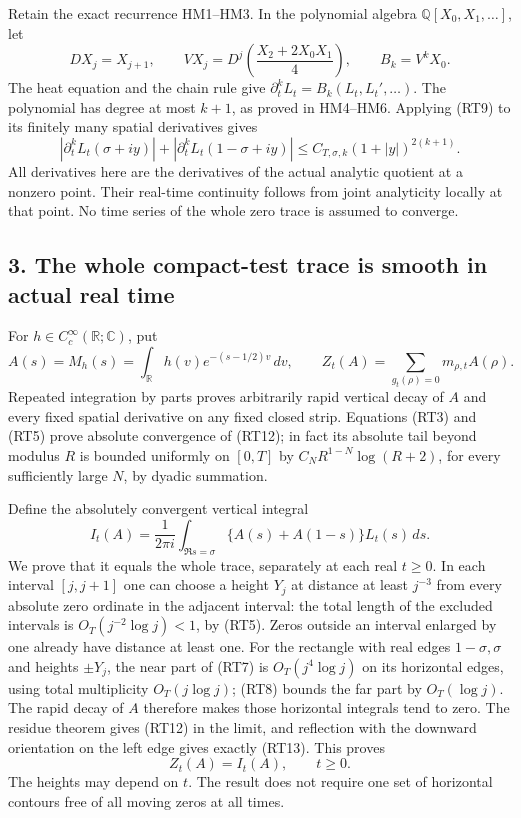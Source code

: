 \documentclass[
  10pt,
  a4paper,
]{article}
\begin{document}
Retain the exact recurrence HM1--HM3. In the polynomial algebra
\(\mathbb Q[X_0,X_1,\ldots]\), let \[
DX_j=X_{j+1},\qquad
VX_j=D^j\!\left(\frac{X_2+2X_0X_1}{4}\right),\qquad
B_k=V^kX_0.
\tag{RT10}
\] The heat equation and the chain rule give
\(\partial_t^kL_t=B_k(L_t,L_t',\ldots)\). The polynomial has degree at
most \(k+1\), as proved in HM4--HM6. Applying (RT9) to its finitely many
spatial derivatives gives \[
|\partial_t^k L_t(\sigma+iy)|+
|\partial_t^k L_t(1-\sigma+iy)|
\le C_{T,\sigma,k}(1+|y|)^{2(k+1)}.
\tag{RT11}
\] All derivatives here are the derivatives of the actual analytic
quotient at a nonzero point. Their real-time continuity follows from
joint analyticity locally at that point. No time series of the whole
zero trace is assumed to converge.

\subsection{3. The whole compact-test trace is smooth in actual real
time}\label{the-whole-compact-test-trace-is-smooth-in-actual-real-time}

For \(h\in C_c^\infty(\mathbb R;\mathbb C)\), put \[
A(s)=M_h(s)=\int_{\mathbb R}h(v)e^{-(s-1/2)v}\,dv,\qquad
Z_t(A)=\sum_{g_t(\rho)=0}m_{\rho,t}A(\rho).
\tag{RT12}
\] Repeated integration by parts proves arbitrarily rapid vertical decay
of \(A\) and every fixed spatial derivative on any fixed closed strip.
Equations (RT3) and (RT5) prove absolute convergence of (RT12); in fact
its absolute tail beyond modulus \(R\) is bounded uniformly on \([0,T]\)
by \(C_N R^{1-N}\log(R+2)\), for every sufficiently large \(N\), by
dyadic summation.

Define the absolutely convergent vertical integral \[
I_t(A)=\frac1{2\pi i}\int_{\Re s=\sigma}
\{A(s)+A(1-s)\}L_t(s)\,ds.
\tag{RT13}
\] We prove that it equals the whole trace, separately at each real
\(t\ge0\). In each interval \([j,j+1]\) one can choose a height \(Y_j\)
at distance at least \(j^{-3}\) from every absolute zero ordinate in the
adjacent interval: the total length of the excluded intervals is
\(O_T(j^{-2}\log j)<1\), by (RT5). Zeros outside an interval enlarged by
one already have distance at least one. For the rectangle with real
edges \(1-\sigma,\sigma\) and heights \(\pm Y_j\), the near part of
(RT7) is \(O_T(j^4\log j)\) on its horizontal edges, using total
multiplicity \(O_T(j\log j)\); (RT8) bounds the far part by
\(O_T(\log j)\). The rapid decay of \(A\) therefore makes those
horizontal integrals tend to zero. The residue theorem gives (RT12) in
the limit, and reflection with the downward orientation on the left edge
gives exactly (RT13). This proves \[
Z_t(A)=I_t(A),\qquad t\ge0.
\tag{RT14}
\] The heights may depend on \(t\). The result does not require one set
of horizontal contours free of all moving zeros at all times.
\end{document}
